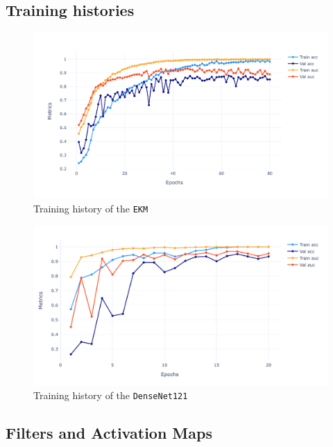 \documentclass[aps,twocolumn,secnumarabic,nobalancelastpage,amsmath,amssymb,
nofootinbib]{revtex4}
\begin{document}
\subsection*{Training histories}

\begin{figure}[h!]
	\centering
	\includegraphics[width=0.8\linewidth]{Images/TrainingHistoryEKM}
	\caption{Training history of the \texttt{EKM}}
	\label{fig:traininghistoryekm}
\end{figure}



\begin{figure}[h!]
	\centering
	\includegraphics[width=0.8\linewidth]{Images/TrainingHistoryDenseNet121}
	\caption{Training history of the \texttt{DenseNet121}}
	\label{fig:traininghistorydensenet121}
\end{figure}

\newpage

\subsection*{Filters and Activation Maps}
\end{document}
